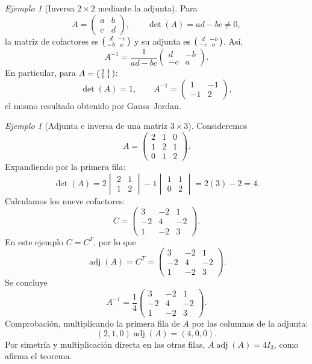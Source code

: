 \documentclass[12pt]{article}
\theoremstyle{remark}
\newtheorem{ejemplo}[definicion]{Ejemplo}
\newcommand{\adj}{\operatorname{adj}}
\begin{document}
\begin{ejemplo}[Inversa $2\times2$ mediante la adjunta]
Para
\[
A=\begin{pmatrix}a&b\\c&d\end{pmatrix},\qquad \det(A)=ad-bc\ne0,
\]
la matriz de cofactores es $\begin{psmallmatrix}d&-c\\-b&a\end{psmallmatrix}$ y su adjunta es $\begin{psmallmatrix}d&-b\\-c&a\end{psmallmatrix}$. Así,
\[
\boxed{A^{-1}=\frac{1}{ad-bc}\begin{pmatrix}d&-b\\-c&a\end{pmatrix}.}
\]
En particular, para $A=\begin{psmallmatrix}2&1\\1&1\end{psmallmatrix}$:
\[
\det(A)=1,\qquad A^{-1}=\begin{pmatrix}1&-1\\-1&2\end{pmatrix},
\]
el mismo resultado obtenido por Gauss--Jordan.
\end{ejemplo}

\begin{ejemplo}[Adjunta e inversa de una matriz $3\times3$]
Consideremos
\[
A=\begin{pmatrix}2&1&0\\1&2&1\\0&1&2\end{pmatrix}.
\]
Expandiendo por la primera fila:
\[
\det(A)=2\begin{vmatrix}2&1\\1&2\end{vmatrix}
-1\begin{vmatrix}1&1\\0&2\end{vmatrix}
=2(3)-2=4.
\]
Calculamos los nueve cofactores:
\[
C=\begin{pmatrix}
3&-2&1\\
-2&4&-2\\
1&-2&3
\end{pmatrix}.
\]
En este ejemplo $C=C^T$, por lo que
\[
\adj(A)=C^T=\begin{pmatrix}
3&-2&1\\-2&4&-2\\1&-2&3
\end{pmatrix}.
\]
Se concluye
\[
\boxed{A^{-1}=\frac14\begin{pmatrix}
3&-2&1\\-2&4&-2\\1&-2&3
\end{pmatrix}.}
\]
Comprobación, multiplicando la primera fila de $A$ por las columnas de la adjunta:
\[
(2,1,0)\adj(A)=(4,0,0).
\]
Por simetría y multiplicación directa en las otras filas, $A\adj(A)=4I_3$, como afirma el teorema.
\end{ejemplo}
\end{document}
